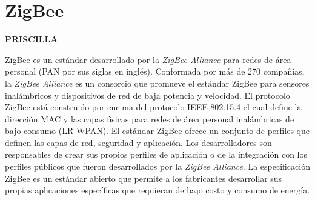 \documentclass[10pt,journal,compsoc]{IEEEtran}
\begin{document}




% 
% 
% 
% 


\section{ZigBee}

\textbf{PRISCILLA}

ZigBee es un estándar desarrollado por la \emph{ZigBee Alliance} para redes de área personal (PAN por sus siglas en inglés). Conformada por más de 270 compañías, la \emph{ZigBee Alliance} es un consorcio que promueve el estándar ZigBee para sensores inalámbricos y dispositivos de red de baja potencia y velocidad. El protocolo ZigBee está construido por encima del protocolo IEEE 802.15.4 el cual define la dirección MAC y las capas físicas para redes de área personal inalámbricas de bajo consumo (LR-WPAN). El estándar ZigBee ofrece un conjunto de perfiles que definen las capas de red, seguridad y aplicación. Los desarrolladores son responsables de crear sus propios perfiles de aplicación o de la integración con los perfiles públicos que fueron desarrollados por la \emph{ZigBee Alliance}. La especificación ZigBee es un estándar abierto que permite a los fabricantes desarrollar sus propias aplicaciones específicas que requieran de bajo costo y consumo de energía.
\end{document}
